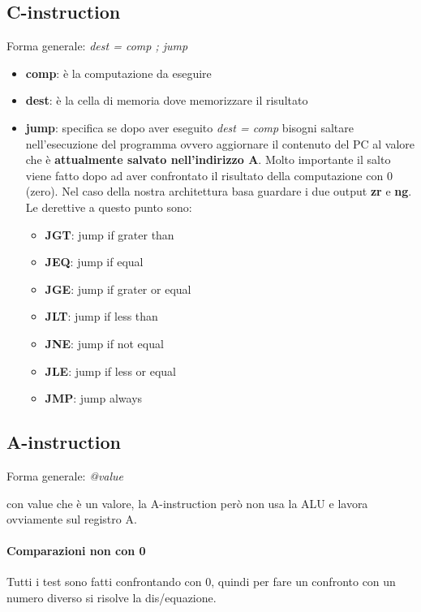 \documentclass{article}
\begin{document}
\subsection{C-instruction}
\begin{center}
    Forma generale: \textit{dest = comp ; jump}
\end{center}
\begin{itemize}
    \item \textbf{comp}: è la computazione da eseguire
    \item \textbf{dest}: è la cella di memoria dove memorizzare il risultato
    \item \textbf{jump}: specifica se dopo aver eseguito \textit{dest = comp} bisogni saltare nell'esecuzione del programma ovvero aggiornare il contenuto del PC al valore che è \textbf{attualmente salvato nell'indirizzo A}. Molto importante il salto viene fatto dopo ad aver confrontato il risultato della computazione con 0 (zero). Nel caso della nostra architettura basa guardare i due output \textbf{zr} e \textbf{ng}. Le derettive a questo punto sono: \begin{itemize}
        \item \textbf{JGT}: jump if grater than
        \item \textbf{JEQ}: jump if equal
        \item \textbf{JGE}: jump if grater or equal
        \item \textbf{JLT}: jump if less than
        \item \textbf{JNE}: jump if not equal
        \item \textbf{JLE}: jump if less or equal
        \item \textbf{JMP}: jump always
    \end{itemize} 
\end{itemize}

\subsection{A-instruction}
\begin{center}
    Forma generale: \textit{@value}
\end{center}

con value che è un valore, la A-instruction però non usa la ALU e lavora ovviamente sul registro A.

\paragraph{Comparazioni non con 0}
Tutti i test sono fatti confrontando con 0, quindi per fare un confronto con un numero diverso si risolve la dis/equazione.
\end{document}
